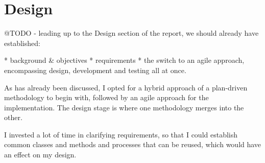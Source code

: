 \chapter{Design} %

@TODO - leading up to the Design section of the report, we should already have established:

* background \& objectives
* requirements
* the switch to an agile approach, encompassing design, development and testing all at once.


As has already been discussed, I opted for a hybrid approach of a plan-driven methodology to begin with, followed by an agile approach for the implementation. The design stage is where one methodology merges into the other.

I invested a lot of time in clarifying requirements, so that I could establish common classes and methods and processes that can be reused, which would have an effect on my design.

